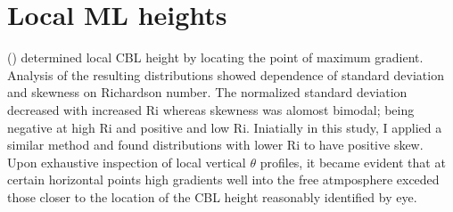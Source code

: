 
\section{Local \acs{ML} heights}

\citeauthor{SullMoengStev} (\citeyear{SullMoengStev}) determined local \acs{CBL} height by locating the point of maximum gradient.  Analysis of the resulting distributions showed dependence of standard deviation and skewness on Richardson number.  The normalized standard deviation decreased with increased \acs{Ri} whereas skewness was alomost bimodal; being negative at high \acs{Ri} and positive and low \acs{Ri}.  Iniatially in this study, I applied a similar method and found distributions with lower \acs{Ri} to have positive skew.  Upon exhaustive inspection of local vertical $\theta$  profiles, it became evident that at certain horizontal points high gradients well into the free atmposphere exceded those closer to the location of the \acs{CBL} height reasonably identified by eye.\\

